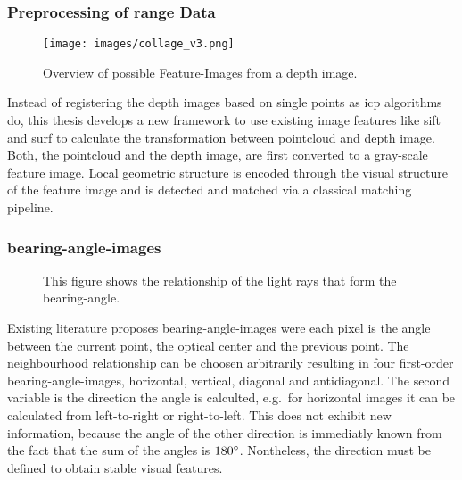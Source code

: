 \documentclass[doktyp=marbeit,fontsize=12pt,sprache=english,draft=true,hausschrift=true]{TUBAFarbeiten}
\begin{document}
\subsubsection{Preprocessing of range Data}\label{preprocessing-of-range-data}

\begin{figure}[H]
    \centering
    \texttt{[image: images/collage\_v3.png]}
    \caption{Overview of possible Feature-Images from a depth image.}
\end{figure}

Instead of registering the depth images based on single points as \gls{icp} algorithms do, this thesis develops a new framework to use existing image features like \Gls{sift} and \Gls{surf} to calculate the transformation between pointcloud and depth image.
Both, the pointcloud and the depth image, are first converted to a gray-scale feature image.
Local geometric structure is encoded through the visual structure of the feature image and is detected and matched via a classical matching pipeline.

\subsubsection{\Glspl{bearing-angle-image}}


\begin{figure}[H]
    \centering
    \caption{This figure shows the relationship of the light rays that form the \gls{bearing-angle}.}
\end{figure}

Existing literature\cite{Scaramuzza2007,Lin2017} proposes \Glspl{bearing-angle-image} were each pixel is the angle between the current point, the optical center and the previous point.
The neighbourhood relationship can be choosen arbitrarily resulting in four first-order \Glspl{bearing-angle-image}, horizontal, vertical, diagonal and antidiagonal.
The second variable is the direction the angle is calculted, e.g.~for horizontal images it can be calculated from left-to-right or right-to-left.
This does not exhibit new information, because the angle of the other direction is immediatly known from the fact that the sum of the angles is $180\degree$.
Nontheless, the direction must be defined to obtain stable visual features.

\end{document}
